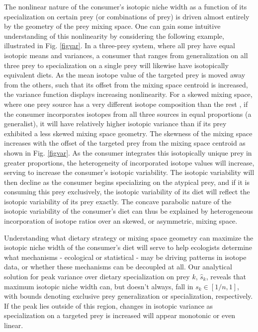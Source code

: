 \documentclass{article}
\begin{document}
The nonlinear nature of the consumer's isotopic niche width as a function of its specialization on certain prey (or combinations of prey) is driven almost entirely by the geometry of the prey mixing space.
One can gain some intuitive understanding of this nonlinearity by considering the following example, illustrated in Fig. \ref{figvar}.
In a three-prey system, where all prey have equal isotopic means and variances, a consumer that ranges from generalization on all three prey to specialization on a single prey will likewise have isotopically equivalent diets.
As the mean isotope value of the targeted prey is moved away from the others, such that its offset from the mixing space centroid \citep[the center of the mixing space;][]{Layman:2007vi,Newsome:WhhVfocb} is increased, the variance function displays increasing nonlinearity.
For a skewed mixing space, where one prey source has a very different isotope composition than the rest \citep[e.g. a mixing space consisting of terrestrial foods vs. a marine subsidy;][]{Newsome:2004p992}, if the consumer incorporates isotopes from all three sources in equal proportions (a generalist), it will have relatively higher isotopic variance than if its prey exhibited a less skewed mixing space geometry.
The skewness of the mixing space increases with the offset of the targeted prey from the mixing space centroid as shown in Fig. \ref{figvar}.
As the consumer integrates this isotopically unique prey in greater proportions, the heterogeneity of incorporated isotope values will increase, serving to increase the consumer's isotopic variability.
The isotopic variability will then decline as the consumer begins specializing on the atypical prey, and if it is consuming this prey exclusively, the isotopic variability of its diet will reflect the isotopic variability of its prey exactly.
The concave parabolic nature of the isotopic variability of the consumer's diet can thus be explained by heterogeneous incorporation of isotope ratios over an skewed, or asymmetric, mixing space.


Understanding what dietary strategy or mixing space geometry can maximize the isotopic niche width of the consumer's diet will serve to help ecologists determine what mechanisms - ecological or statistical - may be driving patterns in isotope data, or whether these mechanisms can be decoupled at all.
Our analytical solution for peak variance over dietary specialization on prey $k$, $\hat s_k$, reveals that maximum isotopic niche width can, but doesn't always, fall in $s_k \in [1/n,1]$, with bounds denoting exclusive prey generalization or specialization, respectively.
If the peak lies outside of this region, changes in isotopic variance as specialization on a targeted prey is increased will appear monotonic or even linear.
\end{document}
